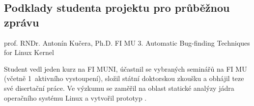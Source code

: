\documentclass{DG-report}
\newcommand{\note}[1]{[[ \emph{#1} ]]}
\renewcommand{\note}[1]{}
\begin{document}

\subsection*{Podklady studenta projektu pro průběžnou zprávu}

\note{Níže uveďte jméno, univerzitu, ročník, školitele a předpokládaný/finální
název disertace. Ti, kdo již obhájili, použijí makro \texttt{absolvent} namísto
\texttt{student}.}

  {prof. RNDr. Antonín Kučera, Ph.D.}		%
  {FI MU}				%
  {3.}					%
  {Automatic Bug-finding Techniques for Linux Kernel}		%

\kratkeinfo

\note{Krátká charakteristika studia v daném roce (2--3 věty, nejlépe s odkazy na
publikace). Pište ve 3. osobě, prosím dodržte formát -- níže je uveden
příklad:}\bigskip

\noindent Student vedl jeden kurz na FI MUNI, účastnil se vybraných
seminářů na FI MU (včetně 1~aktivního vystoupení), složil státní
doktorskou zkoušku a obhájil teze své disertační práce. Ve výzkumu se zaměřil
na oblast statické analýzy jádra operačního systému Linux a 
vytvořil prototyp \cite{Slaby10a}.

\publikace

\note{Níže uveďte publikační a realizační výstupy za daný rok (uveďte i přijaté
publikace, s poznámkou přijato, příští rok dodáte definitivní záznam). Prosím
neužívejte slepě výpis z různých informačních systémů -- pokuste se dodržet
formát běžně generovaný z BiBTeX záznamů (bbl) tak, jak je použit níže.
Publikace označte jako Voprsalek10a, Voprsalek10b atd., ať se to dá nějak
rozumně sestavit za všechny studenty. \textbf{Vykazuje-li více studentů tutéž
publikaci, použijte totéž označení!!!!!!} Prázdné kategorie prosím
smažte.}\bigskip
\end{document}
